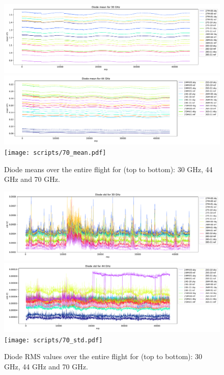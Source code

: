 \documentclass[twocolumn]{aa}
\begin{document}
\begin{figure}[t]
  \center
  \includegraphics[width=\linewidth]{scripts/30_mean.pdf}\\
  \includegraphics[width=\linewidth]{scripts/44_mean.pdf}\\
  \texttt{[image: scripts/70\_mean.pdf]}
  \caption{Diode means over the entire flight for (top to bottom): 30 GHz, 44 GHz and 70 GHz. 
  }\label{fig:means}
\end{figure}

\begin{figure}[t]
  \center
  \includegraphics[width=\linewidth]{scripts/30_std.pdf}\\
  \includegraphics[width=\linewidth]{scripts/44_std.pdf}\\
  \texttt{[image: scripts/70\_std.pdf]}
  \caption{Diode RMS values over the entire flight for (top to bottom): 30 GHz, 44 GHz and 70 GHz. 
  }\label{fig:rms}
\end{figure}
\end{document}
